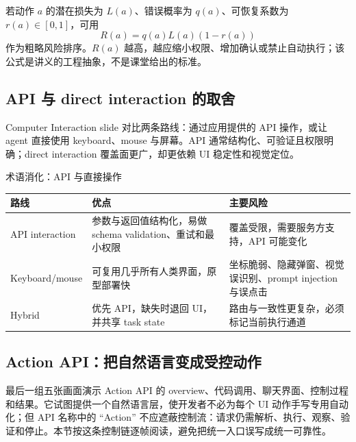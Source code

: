 若动作 $a$ 的潜在损失为 $L(a)$、错误概率为 $q(a)$、可恢复系数为 $r(a)\in[0,1]$，可用
\[
R(a)=q(a)L(a)(1-r(a))
\]
作为粗略风险排序。$R(a)$ 越高，越应缩小权限、增加确认或禁止自动执行；该公式是讲义的工程抽象，不是课堂给出的标准。


\subsection{API 与 direct interaction 的取舍}

Computer Interaction slide 对比两条路线：通过应用提供的 API 操作，或让 agent 直接使用 keyboard、mouse 与屏幕。API 通常结构化、可验证且权限明确；direct interaction 覆盖面更广，却更依赖 UI 稳定性和视觉定位。


\begin{knowledgebox}{术语消化：API 与直接操作}
\begin{tabularx}{\textwidth}{L{0.18\textwidth}X X}
\toprule
路线 & 优点 & 主要风险 \\
\midrule
API interaction & 参数与返回值结构化，易做 schema validation、重试和最小权限 & 覆盖受限，需要服务方支持，API 可能变化 \\
Keyboard/mouse & 可复用几乎所有人类界面，原型部署快 & 坐标脆弱、隐藏弹窗、视觉误识别、prompt injection 与误点击 \\
Hybrid & 优先 API，缺失时退回 UI，并共享 task state & 路由与一致性更复杂，必须标记当前执行通道 \\
\bottomrule
\end{tabularx}
\end{knowledgebox}


\subsection{Action API：把自然语言变成受控动作}

最后一组五张画面演示 Action API 的 overview、代码调用、聊天界面、控制过程和结果。它试图提供一个自然语言层，使开发者不必为每个 UI 动作手写专用自动化；但 API 名称中的 “Action” 不应遮蔽控制流：请求仍需解析、执行、观察、验证和停止。本节按这条控制链逐帧阅读，避免把统一入口误写成统一可靠性。

